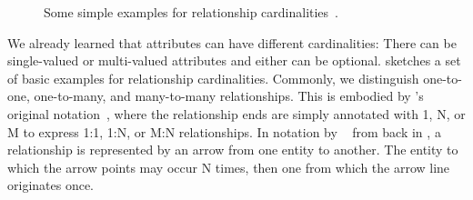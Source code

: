 %
%
\label{sec:conceptual:relationshipCardinalities}%
%
\begin{figure}%
%
%
%
\floatSep%
%
%
%
\floatSep%
%
%
%
\caption{Some simple examples for relationship cardinalities~\cite{SS2005EIDDDFDB:CDDICAMP,V1999C5DMS:CDUTERM}.}%
\label{fig:relationshipCardinalities}%
%
\end{figure}%
%
We already learned that attributes can have different cardinalities:
There can be single-valued or multi-valued attributes and either can be optional.
 sketches a set of basic examples for relationship cardinalities.
Commonly, we distinguish one-to-one, one-to-many, and many-to-many relationships.
This is embodied by \citeauthor{C1976TERMTAUVOD}'s original  notation~\cite{C1976TERMTAUVOD}, where the relationship ends are simply annotated with 1, N, or M to express 1:1, 1:N, or M:N relationships.
In notation by \citeauthor{B1969DSD}~\cite{B1969DSD} from back in \citeyear{B1969DSD}, a relationship is represented by an arrow from one entity to another.
The entity to which the arrow points may occur N times, then one from which the arrow line originates once.

